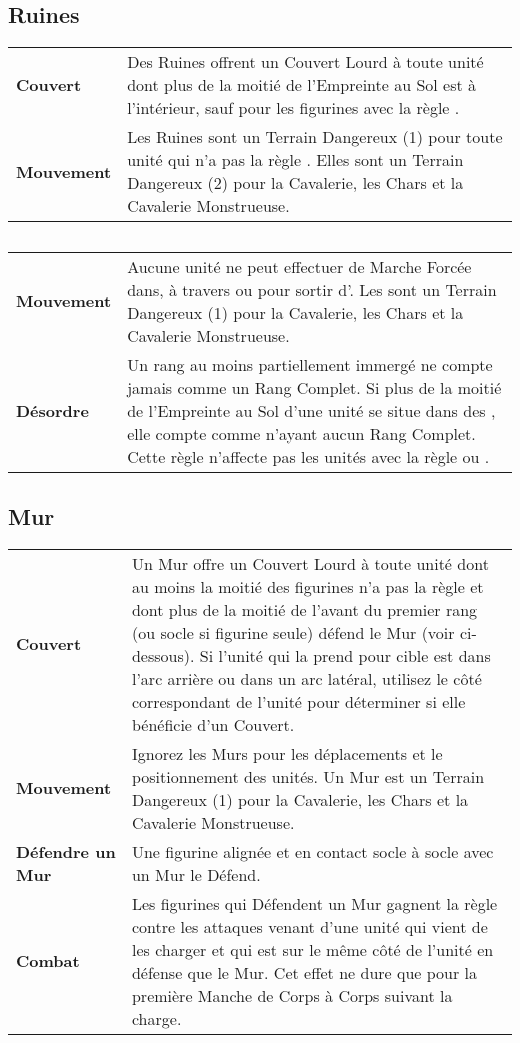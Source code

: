 \hypertarget{ruins}{\subsection{Ruines}}

\noindent\begin{tabular}{>{\bfseries\raggedleft}p{2.2cm}p{13.5cm}}
Couvert & Des Ruines offrent un Couvert Lourd à toute unité dont plus de la moitié de l'Empreinte au Sol est à l'intérieur, sauf pour les figurines avec la règle \toweringpresence{}. \tabularnewline
Mouvement & Les Ruines sont un Terrain Dangereux (1) pour toute unité qui n'a pas la règle \skirmisher{}. Elles sont un Terrain Dangereux (2) pour la Cavalerie, les Chars et la Cavalerie Monstrueuse. \tabularnewline
\end{tabular}

\hypertarget{water}{\subsection{\water}}

\noindent\begin{tabular}{>{\bfseries\raggedleft}p{2.2cm}p{13.5cm}}
Mouvement & Aucune unité ne peut effectuer de Marche Forcée dans, à travers ou pour sortir d'\water{}. Les \water{} sont un Terrain Dangereux (1) pour la Cavalerie, les Chars et la Cavalerie Monstrueuse. \tabularnewline
Désordre & Un rang au moins partiellement immergé ne compte jamais comme un Rang Complet. Si plus de la moitié de l'Empreinte au Sol d'une unité se situe dans des \water{}, elle compte comme n'ayant aucun Rang Complet. Cette règle n'affecte pas les unités avec la règle \strider{} ou \strider{\water}. \tabularnewline
\end{tabular}

\hypertarget{walls}{\subsection{Mur}}

\noindent\begin{tabular}{>{\bfseries\raggedleft}p{2.2cm}p{13.5cm}}
Couvert & Un Mur offre un Couvert Lourd à toute unité dont au moins la moitié des figurines n'a pas la règle \toweringpresence{} et dont plus de la moitié de l'avant du premier rang (ou socle si figurine seule) défend le Mur (voir ci-dessous). Si l'unité qui la prend pour cible est dans l'arc arrière ou dans un arc latéral, utilisez le côté correspondant de l'unité pour déterminer si elle bénéficie d'un Couvert. \tabularnewline
Mouvement & Ignorez les Murs pour les déplacements et le positionnement des unités. Un Mur est un Terrain Dangereux (1) pour la Cavalerie, les Chars et la Cavalerie Monstrueuse. \tabularnewline
Défendre un Mur & Une figurine alignée et en contact socle à socle avec un Mur le Défend. \tabularnewline
Combat & Les figurines qui Défendent un Mur gagnent la règle \distracting{} contre les attaques venant d'une unité qui vient de les charger et qui est sur le même côté de l'unité en défense que le Mur. Cet effet ne dure que pour la première Manche de Corps à Corps suivant la charge. \tabularnewline
\end{tabular}

